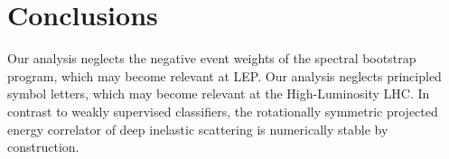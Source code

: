 \section{Conclusions}\label{sec:conclusions}

Our analysis neglects the negative event weights of the spectral
bootstrap program, which may become relevant at LEP. Our analysis
neglects principled symbol letters, which may become relevant at the
High-Luminosity LHC. In contrast to weakly supervised classifiers, the
rotationally symmetric projected energy correlator of deep inelastic
scattering is numerically stable by construction.

